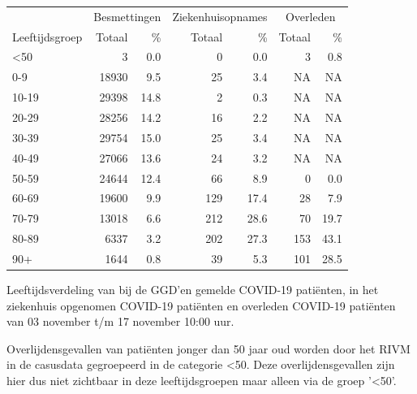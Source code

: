 \documentclass[
  english,
  man,floatsintext]{apa6}
\begin{document}
\begin{table}
\centering\begingroup\fontsize{11}{13}\selectfont

\begin{threeparttable}
\begin{tabular}{lrrrrrr}
\toprule
\multicolumn{1}{c}{ } & \multicolumn{2}{c}{Besmettingen} & \multicolumn{2}{c}{Ziekenhuisopnames} & \multicolumn{2}{c}{Overleden} \\
\cmidrule(l{3pt}r{3pt}){2-3} \cmidrule(l{3pt}r{3pt}){4-5} \cmidrule(l{3pt}r{3pt}){6-7}
Leeftijdsgroep & Totaal & \% & Totaal & \% & Totaal & \%\\
\midrule
<50 & 3 & 0.0 & 0 & 0.0 & 3 & 0.8\\
0-9 & 18930 & 9.5 & 25 & 3.4 & NA & NA\\
10-19 & 29398 & 14.8 & 2 & 0.3 & NA & NA\\
20-29 & 28256 & 14.2 & 16 & 2.2 & NA & NA\\
30-39 & 29754 & 15.0 & 25 & 3.4 & NA & NA\\
40-49 & 27066 & 13.6 & 24 & 3.2 & NA & NA\\
50-59 & 24644 & 12.4 & 66 & 8.9 & 0 & 0.0\\
60-69 & 19600 & 9.9 & 129 & 17.4 & 28 & 7.9\\
70-79 & 13018 & 6.6 & 212 & 28.6 & 70 & 19.7\\
80-89 & 6337 & 3.2 & 202 & 27.3 & 153 & 43.1\\
90+ & 1644 & 0.8 & 39 & 5.3 & 101 & 28.5\\
\bottomrule
\end{tabular}
\begin{tablenotes}
\item[1] Leeftijdsverdeling van bij de GGD’en gemelde COVID-19 patiënten, in het ziekenhuis opgenomen COVID-19 patiënten en overleden COVID-19 patiënten van 03 november t/m 17 november 10:00 uur.
\item[2] Overlijdensgevallen van patiënten jonger dan 50 jaar oud worden door het RIVM in de casusdata gegroepeerd in de categorie <50. Deze overlijdensgevallen zijn hier dus niet zichtbaar in deze leeftijdsgroepen maar alleen via de groep '<50'.
\end{tablenotes}
\end{threeparttable}
\endgroup{}
\end{table}

\newpage
\end{document}
